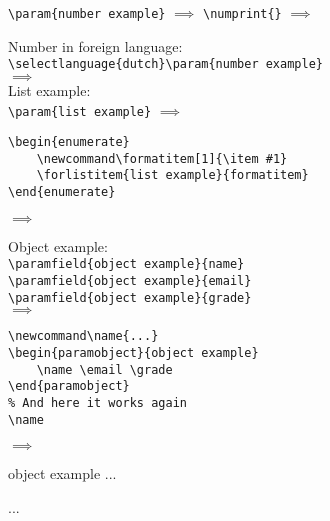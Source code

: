 \documentclass{article}
\begin{document}
    \lstinline[style=TeX,morekeywords={param}]|\param{number example}|
    $\implies$
    \lstinline[style=TeX,morekeywords={numprint}]|\numprint{|\verb|}|
    $\implies$
    \\

    \clearpage

    Number in foreign language:\\

    \lstinline[style=TeX,morekeywords={param,selectlanguage}]|\selectlanguage{dutch}\param{number example}|\\
    $\implies$
    \begingroup{}\endgroup\\

    List example:\\

    \lstinline[style=TeX,morekeywords={param}]|\param{list example}|
    $\implies$
    \\

    \begin{lstlisting}[language={[LaTeX]TeX},morekeywords={formatitem,forlistitem}]
\begin{enumerate}
    \newcommand\formatitem[1]{\item #1}
    \forlistitem{list example}{formatitem}
\end{enumerate}
    \end{lstlisting}
    $\implies$
    \begin{enumerate}
        \newcommand\formatitem[1]{\item #1}
    \end{enumerate}

    Object example:\\

    \lstinline[style=TeX,morekeywords={paramfield}]|\paramfield{object example}{name}|\\
    \lstinline[style=TeX,morekeywords={paramfield}]|\paramfield{object example}{email}|\\
    \lstinline[style=TeX,morekeywords={paramfield}]|\paramfield{object example}{grade}|\\
    $\implies$
    \\

    \begin{lstlisting}[style=TeX,morekeywords={name,email,grade}]
\newcommand\name{...}
\begin{paramobject}{object example}
    \name \email \grade
\end{paramobject}
% And here it works again
\name
    \end{lstlisting}
    $\implies$
    \newcommand\name{...}%
    \parbox{\linewidth}{
    \begin{paramobject}{object example}
        \name \email \grade
    \end{paramobject}
    \name
    }\\
\end{document}
